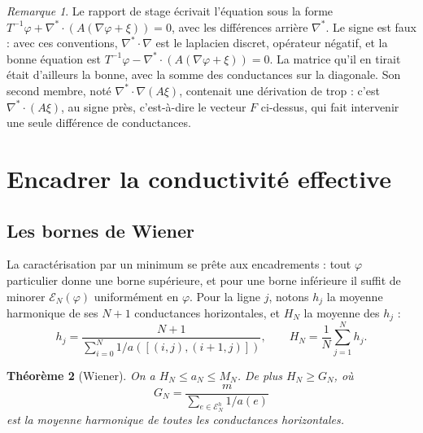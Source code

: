 \documentclass[11pt,a4paper]{article}
\theoremstyle{plain}
\newtheorem{theoreme}{Théorème}[section]
\theoremstyle{definition}
\theoremstyle{remark}
\newtheorem{remarque}[theoreme]{Remarque}
\newcommand{\E}{\mathcal{E}}
\begin{document}
\begin{remarque}
Le rapport de stage écrivait l'équation sous la forme $T^{-1}\varphi+\nabla^*\cdot(A(\nabla\varphi+\xi))=0$, avec les différences arrière $\nabla^*$. Le signe est faux : avec ces conventions, $\nabla^*\cdot\nabla$ est le laplacien discret, opérateur négatif, et la bonne équation est $T^{-1}\varphi-\nabla^*\cdot(A(\nabla\varphi+\xi))=0$. La matrice qu'il en tirait était d'ailleurs la bonne, avec la somme des conductances sur la diagonale. Son second membre, noté $\nabla^*\cdot\nabla(A\xi)$, contenait une dérivation de trop : c'est $\nabla^*\cdot(A\xi)$, au signe près, c'est-à-dire le vecteur $F$ ci-dessus, qui fait intervenir une seule différence de conductances.
\end{remarque}

\section{Encadrer la conductivité effective}

\subsection{Les bornes de Wiener}

La caractérisation par un minimum se prête aux encadrements : tout $\varphi$ particulier donne une borne supérieure, et pour une borne inférieure il suffit de minorer $\E_N(\varphi)$ uniformément en $\varphi$. Pour la ligne $j$, notons $h_j$ la moyenne harmonique de ses $N+1$ conductances horizontales, et $H_N$ la moyenne des $h_j$ :
\[
  h_j=\frac{N+1}{\sum_{i=0}^{N}1/a([(i,j),(i+1,j)])},\qquad H_N=\frac1N\sum_{j=1}^Nh_j .
\]

\begin{theoreme}[Wiener]\label{thm:wiener}
On a $H_N\leq a_N\leq M_N$. De plus $H_N\geq G_N$, où
\[
  G_N=\frac{m}{\sum_{e\in\E^h_N}1/a(e)}
\]
est la moyenne harmonique de toutes les conductances horizontales.
\end{theoreme}
\end{document}
